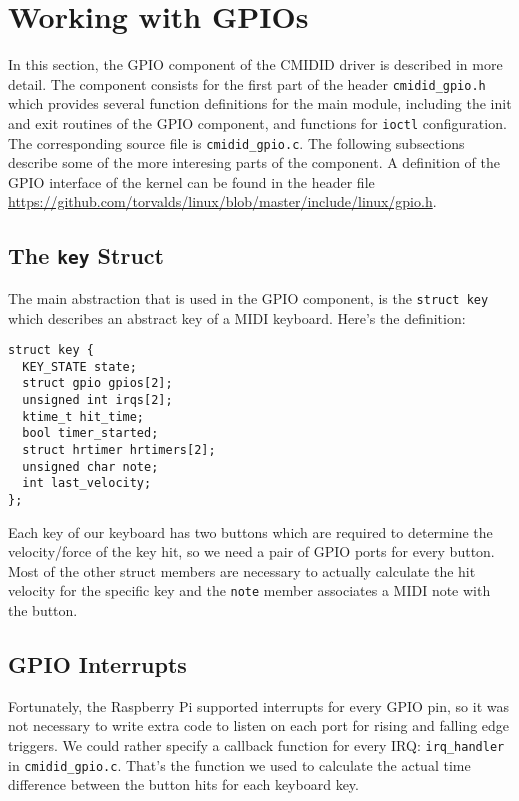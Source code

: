 \documentclass[paper=a4,fontsize=11pt,twocolumn,pagesize,bibtotoc]{scrartcl}
\begin{document}
\section{Working with GPIOs}
\label{michael:gpios}
In this section, the GPIO component of the CMIDID driver is described in more
detail. The component consists for the first part of the header \texttt{cmidid\_gpio.h} which
provides several function definitions for the main module, including the 
init and exit routines of the GPIO component, and functions for \texttt{ioctl}
configuration. The corresponding source file is \texttt{cmidid\_gpio.c}.
The following subsections describe some of the more interesing parts of the 
component. A definition of the GPIO interface of the kernel can be found in 
the header file \url{https://github.com/torvalds/linux/blob/master/include/linux/gpio.h}.

\subsection{The \texttt{key} Struct}
\label{gpios:key}

The main abstraction that is used in the GPIO component, is the \texttt{struct key}
which describes an abstract key of a MIDI keyboard. Here's the definition:
\begin{lstlisting}
struct key {
  KEY_STATE state;
  struct gpio gpios[2];
  unsigned int irqs[2];
  ktime_t hit_time;
  bool timer_started;
  struct hrtimer hrtimers[2];
  unsigned char note;
  int last_velocity;
};
\end{lstlisting}
Each key of our keyboard has two buttons which are required to determine the
velocity/force of the key hit, so we need a pair of GPIO ports for every button.
Most of the other struct members are necessary to actually calculate the 
hit velocity for the specific key and the \texttt{note} member associates a
MIDI note with the button.

\subsection{GPIO Interrupts}
\label{gpios:interrupts}
Fortunately, the Raspberry Pi supported interrupts for every GPIO pin, so it
was not necessary to write extra code to listen on each port for rising and 
falling edge triggers. We could rather specify a callback function for every
IRQ: \texttt{irq\_handler} in \texttt{cmidid\_gpio.c}. That's the function we
used to calculate the actual time difference between the button hits for each
keyboard key.
\end{document}
